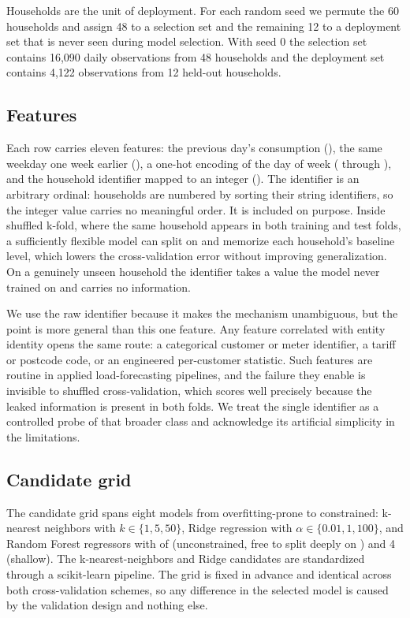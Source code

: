\documentclass[10pt]{article}
\newcommand{\pkg}[1]{\textsf{#1}}
\DeclareRobustCommand{\code}[1]{\texttt{\detokenize{#1}}}
\begin{document}
Households are the unit of deployment. For each random seed we permute the 60
households and assign 48 to a selection set and the remaining 12 to a deployment
set that is never seen during model selection. With seed 0 the selection set
contains 16{,}090 daily observations from 48 households and the deployment set
contains 4{,}122 observations from 12 held-out households.

\subsection{Features}

Each row carries eleven features: the previous day's consumption (\code{lag_1}),
the same weekday one week earlier (\code{lag_7}), a one-hot encoding of the day
of week (\code{dow_0} through \code{dow_6}), and the household identifier mapped
to an integer (\code{hh_int}). The identifier is an arbitrary ordinal: households
are numbered by sorting their string identifiers, so the integer value carries no
meaningful order. It is included on purpose. Inside shuffled k-fold, where the
same household appears in both training and test folds, a sufficiently flexible
model can split on \code{hh_int} and memorize each household's baseline level,
which lowers the cross-validation error without improving generalization. On a
genuinely unseen household the identifier takes a value the model never trained
on and carries no information.

We use the raw identifier because it makes the mechanism unambiguous, but the
point is more general than this one feature. Any feature correlated with entity
identity opens the same route: a categorical customer or meter identifier, a
tariff or postcode code, or an engineered per-customer statistic. Such features
are routine in applied load-forecasting pipelines, and the failure they enable is
invisible to shuffled cross-validation, which scores well precisely because the
leaked information is present in both folds. We treat the single identifier as a
controlled probe of that broader class and acknowledge its artificial simplicity
in the limitations.

\subsection{Candidate grid}

The candidate grid spans eight models from overfitting-prone to constrained:
k-nearest neighbors with $k \in \{1, 5, 50\}$, Ridge regression with
$\alpha \in \{0.01, 1, 100\}$, and Random Forest regressors with
\code{max_depth} of \code{None} (unconstrained, free to split deeply on
\code{hh_int}) and 4 (shallow). The k-nearest-neighbors and Ridge candidates are
standardized through a \pkg{scikit-learn} pipeline. The grid is fixed in advance
and identical across both cross-validation schemes, so any difference in the
selected model is caused by the validation design and nothing else.
\end{document}
